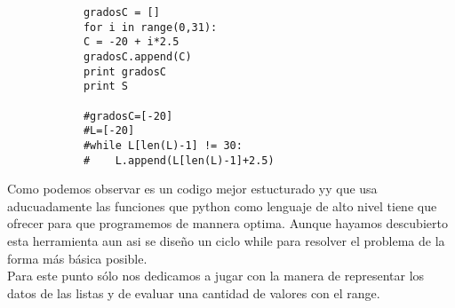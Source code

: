 \documentclass[letterpaper, 12pt, oneside]{article}
\begin{document}
\begin{enumerate}
\begin{enumerate}
\begin{verbatim}
			gradosC = []
			for i in range(0,31):
			C = -20 + i*2.5
			gradosC.append(C)
			print gradosC
			print S
			
			#gradosC=[-20]
			#L=[-20]
			#while L[len(L)-1] != 30:
			#    L.append(L[len(L)-1]+2.5)
			\end{verbatim}
			
			Como podemos observar es un codigo mejor estucturado yy que usa aducuadamente las funciones que python como lenguaje de alto nivel tiene que ofrecer para que programemos de mannera optima. Aunque hayamos descubierto esta herramienta aun asi se diseño un ciclo while para resolver el problema de la forma más básica posible.\\
			
			Para este punto sólo nos dedicamos a jugar con la manera de representar los datos de las listas y de evaluar una cantidad de valores con el range.
			
		
		\end{enumerate}
	\end{enumerate}
\end{document}

